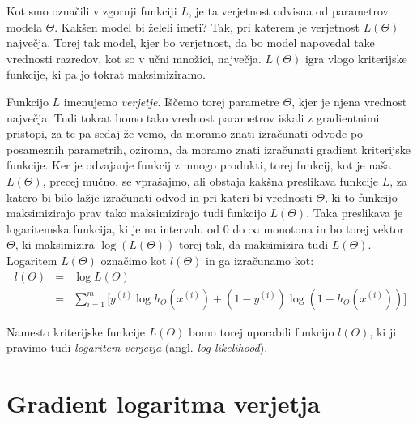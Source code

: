 Kot smo označili v zgornji funkciji $L$, je ta verjetnost odvisna od parametrov modela $\Theta$. Kakšen model bi želeli imeti? Tak, pri katerem je verjetnost $L(\Theta)$ največja. Torej tak model, kjer bo verjetnost, da bo model napovedal take vrednosti razredov, kot so v učni množici, največja. $L(\Theta)$ igra vlogo kriterijske funkcije, ki pa jo tokrat maksimiziramo.

Funkcijo $L$ imenujemo {\em verjetje}. Iščemo torej parametre $\Theta$, kjer je njena vrednost največja. Tudi tokrat bomo tako vrednost parametrov iskali z gradientnimi pristopi, za te pa sedaj že vemo, da moramo znati izračunati odvode po posameznih parametrih, oziroma, da moramo znati izračunati gradient kriterijske funkcije. Ker je odvajanje funkcij z mnogo produkti, torej funkcij, kot je naša $L(\Theta)$, precej mučno, se vprašajmo, ali obstaja kakšna preslikava funkcije $L$, za katero bi bilo lažje izračunati odvod in pri kateri bi vrednosti $\Theta$, ki to funkcijo maksimizirajo prav tako maksimizirajo tudi funkcijo $L(\Theta)$. Taka preslikava je logaritemska funkcija, ki je na intervalu od 0 do $\infty$ monotona in bo torej vektor $\Theta$, ki maksimizira $\log(L(\Theta))$ torej tak, da maksimizira tudi $L(\Theta)$. Logaritem $L(\Theta)$ označimo kot $l(\Theta)$ in ga izračunamo kot:
\begin{eqnarray}
  l(\Theta) & = & \log L(\Theta) \nonumber\\
  & = & \sum_{i=1}^m\big[y^{(i)}\log h_\Theta(x^{(i)})+(1-y^{(i)})\log (1-h_\Theta(x^{(i)})) \big]
\end{eqnarray}

Namesto kriterijske funkcije $L(\Theta)$ bomo torej uporabili funkcijo $l(\Theta)$, ki ji pravimo tudi {\em logaritem verjetja} (angl. {\em log likelihood}).

\section{Gradient logaritma verjetja}

